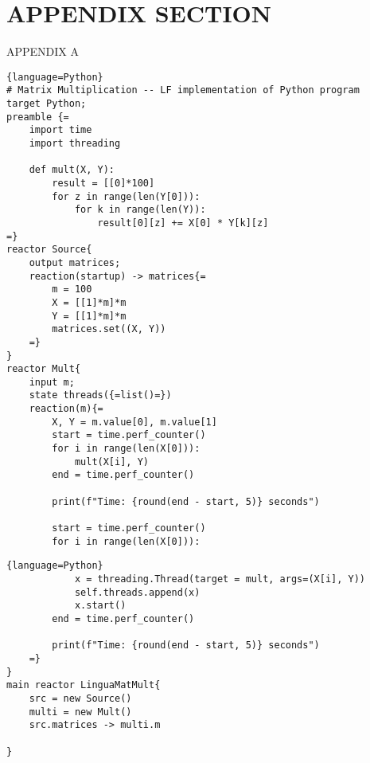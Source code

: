 \chapter*{APPENDIX SECTION}
\label{ch:appendix}

\renewcommand{\thetable}{A.\arabic{table}}  
\renewcommand{\thefigure}{A.\arabic{figure}}
\setcounter{figure}{0}
\setcounter{table}{0}

\begin{center}
APPENDIX A
\end{center}

\begin{lstlisting}{language=Python}
# Matrix Multiplication -- LF implementation of Python program
target Python;
preamble {=
    import time
    import threading

    def mult(X, Y):
        result = [[0]*100]
        for z in range(len(Y[0])):
            for k in range(len(Y)):
                result[0][z] += X[0] * Y[k][z]
=}
reactor Source{
    output matrices;
    reaction(startup) -> matrices{=
        m = 100
        X = [[1]*m]*m
        Y = [[1]*m]*m
        matrices.set((X, Y))
    =}
}
reactor Mult{
    input m;
    state threads({=list()=})
    reaction(m){=
        X, Y = m.value[0], m.value[1]
        start = time.perf_counter()
        for i in range(len(X[0])):
            mult(X[i], Y)
        end = time.perf_counter()

        print(f"Time: {round(end - start, 5)} seconds")

        start = time.perf_counter()
        for i in range(len(X[0])):
\end{lstlisting}
\begin{lstlisting}{language=Python}
            x = threading.Thread(target = mult, args=(X[i], Y))
            self.threads.append(x)
            x.start()
        end = time.perf_counter()

        print(f"Time: {round(end - start, 5)} seconds")
    =}
}
main reactor LinguaMatMult{
    src = new Source()
    multi = new Mult()
    src.matrices -> multi.m

}

\end{lstlisting}